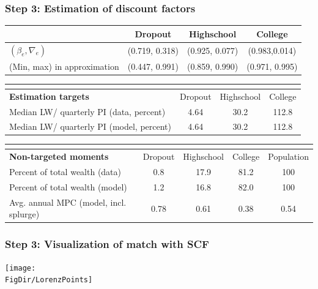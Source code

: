 \documentclass[pdflatex,aspectratio=169]{beamer}
\begin{document}
{  \begin{frame}
    \frametitle{Step 3: Estimation of discount factors}
    \begin{tabular}{lccc}
                                  & Dropout        & Highschool     & College        \\ \hline
      $(\beta_e, \nabla_e)$       & (0.719, 0.318) & (0.925, 0.077) & (0.983,0.014)  \\
      (Min, max) in approximation & (0.447, 0.991) & (0.859, 0.990) & (0.971, 0.995) \\
      \hline
    \end{tabular}
    \begin{tabular}{lccc}
      \multicolumn{4}{l}{ }                                                     \\ \hline
      \textbf{Estimation targets}              & Dropout & Highschool & College \\ \hline
      Median LW/ quarterly PI (data, percent)  & 4.64    & 30.2       & 112.8   \\
      Median LW/ quarterly PI (model, percent) & 4.64    & 30.2       & 112.8   %
      \\ \hline
    \end{tabular}
    \begin{tabular}{lcccc}
      \multicolumn{5}{l}{ }                                                                \\ \hline
      \textbf{Non-targeted moments}          & Dropout & Highschool & College & Population \\ \hline
      Percent of total wealth (data)         & 0.8     & 17.9       & 81.2    & 100        \\
      Percent of total wealth (model)        & 1.2     & 16.8       & 82.0    & 100        \\
      Avg. annual MPC (model, incl. splurge) & 0.78    & 0.61       & 0.38    & 0.54
      \\ \hline
    \end{tabular}
  \end{frame}

  \begin{frame}
    \frametitle{Step 3: Visualization of match with SCF}
    \centering
    \texttt{[image: \\FigDir/LorenzPoints]}
  \end{frame}

}{}
\end{document}
